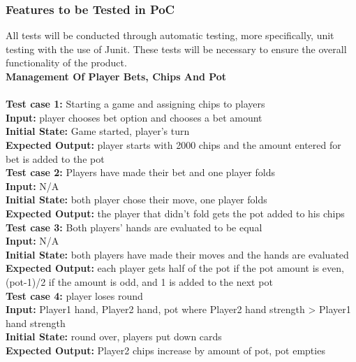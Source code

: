 \documentclass[12pt]{article}
\begin{document}
	\subsubsection{Features to be Tested in PoC}
	All tests will be conducted through automatic testing, more specifically, unit testing with the use of Junit. These tests will be necessary to ensure the overall functionality of the product.\\

	\noindent \textbf{Management Of Player Bets, Chips And Pot}\\
	\\
	\textbf{Test case 1:} Starting a game and assigning chips to players \\
    \textbf{Input:} player chooses bet option and chooses a bet amount\\
    \textbf{Initial State:} Game started, player’s turn\\
	\textbf{Expected Output:} player starts with 2000 chips and the amount entered for bet is added to the pot\\
    
    \noindent \textbf{Test case 2:} Players have made their bet and one player folds\\
    \textbf{Input:} N/A\\
    \textbf{Initial State:} both player chose their move, one player folds\\
    \textbf{Expected Output:} the player that didn’t fold gets the pot added to his chips\\

    \noindent \textbf{Test case 3:} Both players' hands are evaluated to be equal\\
    \textbf{Input:} N/A\\
    \textbf{Initial State:} both players have made their moves and the hands are evaluated\\
	\textbf{Expected Output:} each player gets half of the pot if the pot amount is even, (pot-1)/2 if the amount is odd, and 1 is added to the next pot\\

    \noindent \textbf{Test case 4:} player loses round\\
    \textbf{Input:} Player1 hand, Player2 hand, pot where Player2 hand strength > Player1 hand 
    strength\\
    \textbf{Initial State:} round over, players put down cards\\
    \textbf{Expected Output:} Player2 chips increase by amount of pot, pot empties\\
\end{document}
